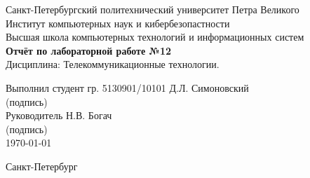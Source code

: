 \begin{titlepage}	%

	\begin{center}		%

		\large Санкт-Петербургский политехнический университет Петра Великого\\[.4cm]
		\large Институт компьютерных наук и кибербезопастности \\[.4cm]
		\large Высшая школа компьютерных технологий и информационных систем\\[6.5cm]
		
		\Large \textbf{Отчёт по лабораторной работе №12}\\[0.3cm]
		\large Дисциплина: Телекоммуникационные технологии.\\[5.5cm]

	\end{center}

	\large Выполнил студент гр. 5130901/10101\hfill \underline{\hphantom{(12подпись12)}} \hfill Д.Л. Симоновский\\[.1cm]
	\large \hphantom{Выполнил студент гр. 5130901/10101}\hfill (подпись) \hfill \hphantom{Д.Л. Симоновский}\\[2cm]

	\large Руководитель \hphantom{дент гр. 513090}\hfill \underline{\hphantom{(12подпись12)}} \hfill Н.В. Богач\\[.1cm]
	\large \hphantom{Выполнил студент гр. 5130901/10101}\hfill (подпись) \hfill \hphantom{Д.Л. Симоновский}\\[2cm]

	\hfill\large \today

	\vfill %

	\begin{center}
	\large Санкт-Петербург\\
	\large \the\year %
	\end{center} %

\end{titlepage} %

\vfill %
